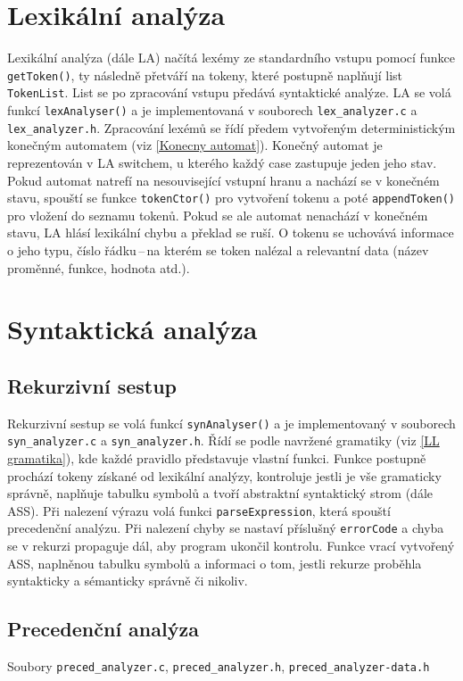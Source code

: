 \documentclass[a4paper, 12pt]{article}
\begin{document}
     \section{Lexikální analýza}
    Lexikální analýza (dále LA) načítá lexémy ze standardního vstupu pomocí funkce \texttt{getToken()}, ty následně přetváří na tokeny, které postupně naplňují list \texttt{TokenList}. List se po zpracování vstupu předává syntaktické analýze. LA se volá funkcí \texttt{lexAnalyser()} a je implementovaná v souborech \texttt{lex\_analyzer.c} a \texttt{lex\_analyzer.h}. Zpracování lexémů se řídí předem vytvořeným deterministickým konečným automatem (viz \ref{Konecny automat}). Konečný automat je reprezentován v LA  switchem, u kterého každý case zastupuje jeden jeho stav. Pokud automat natrefí na nesouvisející vstupní hranu a nachází se v konečném stavu, spouští se funkce \texttt{tokenCtor()} pro vytvoření tokenu a poté \texttt{appendToken()} pro vložení do seznamu tokenů. Pokud se ale automat nenachází v konečném stavu, LA hlásí lexikální chybu a překlad se ruší. O tokenu se uchovává informace o jeho typu, číslo řádku\,--\,na kterém se token nalézal a relevantní data (název proměnné, funkce, hodnota atd.).
    \section{Syntaktická analýza}

    \subsection{Rekurzivní sestup} \label{sestup}
        Rekurzivní sestup se volá funkcí \texttt{synAnalyser()} a je implementovaný v souborech \texttt{syn\_analyzer.c} a \texttt{syn\_analyzer.h}. Řídí se podle navržené gramatiky (viz \ref{LL gramatika}), kde každé pravidlo představuje vlastní funkci. Funkce postupně prochází tokeny získané od lexikální analýzy, kontroluje jestli je vše gramaticky správně, naplňuje tabulku symbolů a tvoří abstraktní syntaktický strom (dále ASS). Při nalezení výrazu volá funkci \texttt{parseExpression}, která spouští precedenční analýzu. Při nalezení chyby se nastaví příslušný \texttt{errorCode} a chyba se v rekurzi propaguje dál, aby program ukončil kontrolu. Funkce vrací vytvořený ASS, naplněnou tabulku symbolů a informaci o tom, jestli rekurze proběhla syntakticky a sémanticky správně či nikoliv.

    \pagebreak
    
    \subsection{Precedenční analýza}
    Soubory \texttt{preced\_analyzer.c}, \texttt{preced\_analyzer.h}, \texttt{preced\_analyzer-data.h}
\end{document}
